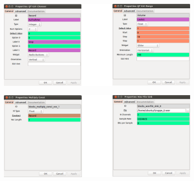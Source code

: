 \documentclass[12pt,a4paper]{article}
\begin{document}
\begin{figure}[hbt!]
\centering
	\includegraphics[width=0.9\textwidth ]
	{Bilder/Aufgabe1-properties4.png}
	\label{fig:Label6}
\end{figure}
\clearpage

\begin{figure}[hbt!]
\centering
	\includegraphics[width=0.9\textwidth ]
	{Bilder/Aufgabe1-properties5.png}
	\label{fig:Label7}
\end{figure}


\newpage
\end{document}
